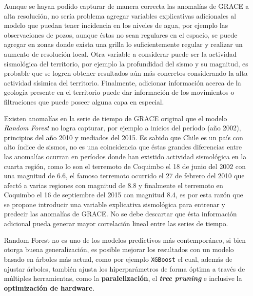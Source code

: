 Aunque se hayan podido capturar de manera correcta las anomalías de GRACE a alta resolución, no sería problema agregar variables explicativas adicionales al modelo que puedan tener incidencia en los niveles de agua, por ejemplo las observaciones de pozos, aunque éstas no sean regulares en el espacio, se puede
agregar en zonas donde exista una grilla lo suficientemente regular y realizar un aumento de resolución local. Otra variable a considerar puede ser la actividad sismológica del territorio, por ejemplo la profundidad del sismo y su magnitud, es probable que se logren obtener resultados aún más concretos considerando la 
alta actividad sísimica del territorio. Finalmente, adicionar información acerca de la geología presente en el territorio puede dar información de los movimientos o filtraciones que puede poseer alguna capa en especial. 

Existen anomalías en la serie de tiempo de GRACE original que el modelo \textit{Random Forest} no logra capturar, por ejemplo a inicios del período (año 2002), principios del año 2010 y mediados del 2015. Es sabido que Chile es un país con alto índice de sismos, no es una coincidencia que éstas grandes diferencias entre las anomalías ocurran 
en períodos donde han existido actividad sismológica en la cuarta región, como lo son el terremoto de Coquimbo el 18 de junio del 2002 con una magnitud de 6.6, el famoso terremoto ocurrido el 27 de febrero del 2010 que afectó a varias regiones con magnitud de 8.8 y finalmente el terremoto en Coquimbo el 16 de septiembre del 2015 con magnitud 8.4,
es por esta razón que se propone introducir una variable explicativa sismológica para entrenar y predecir las anomalías de GRACE. No se debe descartar que ésta información adicional pueda generar mayor correlación lineal entre las series de tiempo.

Random Forest no es uno de los modelos predictivos más contemporáneo, si bien otorga buena generalización, es posible mejorar los resultados con un modelo basado en árboles más actual, como por ejemplo \texttt{XGBoost} el cual, además de ajustar árboles,
también ajusta los hiperparámetros de forma óptima a través de múltiples herramientas, como la \textbf{paralelización}, el \textit{\textbf{tree pruning}} e inclusive
la \textbf{optimización de hardware}.
% 

%
%